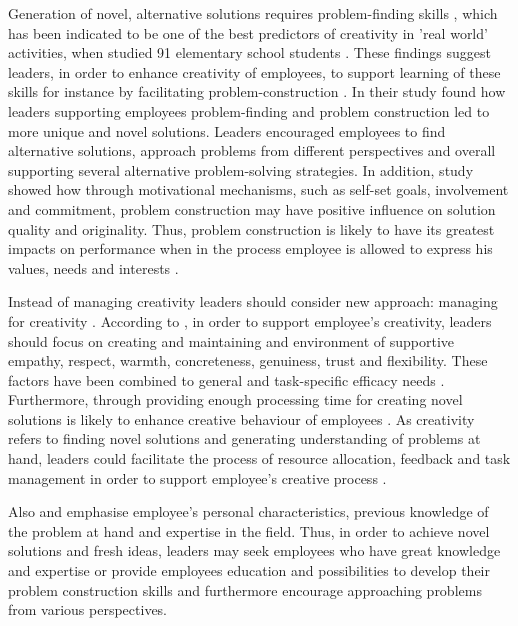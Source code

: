 Generation of novel, alternative solutions requires problem-finding skills \citep{runco1988problem}, which has been indicated to be one of the best predictors of creativity in 'real world' activities, when studied 91 elementary school students \citep{runco1990evaluating}. These findings suggest leaders, in order to enhance creativity of employees, to support learning of these skills for instance by facilitating problem-construction \citep{redmond1993putting}. In their study \citet{redmond1993putting} found how leaders supporting employees problem-finding and problem construction led to more unique and novel solutions. Leaders encouraged employees to find alternative solutions, approach problems from different perspectives and overall supporting several alternative problem-solving strategies. In addition, study showed how through motivational mechanisms, such as self-set goals, involvement and commitment, problem construction may have positive influence on solution quality and originality. Thus, problem construction is likely to have its greatest impacts on performance when in the process employee is allowed to express his values, needs and interests \citep{redmond1993putting}.

Instead of managing creativity leaders should consider new approach: managing for creativity \citep{amabile2008creativity}. According to \citet{isaksen1983toward}, in order to support employee's creativity, leaders should focus on creating and maintaining and environment of supportive empathy, respect, warmth, concreteness, genuiness, trust and flexibility. These factors have been combined to general and task-specific efficacy needs \citep{mumford1988creativity}. Furthermore, through providing enough processing time for creating novel solutions is likely to enhance creative behaviour of employees \citep{isaksen1983toward}. As creativity refers to finding novel solutions and generating understanding of problems at hand, leaders could facilitate the process of resource allocation, feedback and task management in order to support employee's creative process \citep{mumford1988creativity}. 

Also \citet{mumford1988creativity} and \citet{redmond1993putting} emphasise employee's personal characteristics, previous knowledge of the problem at hand and expertise in the field. Thus, in order to achieve novel solutions and fresh ideas, leaders may seek employees who have great knowledge and expertise or provide employees education and possibilities to develop their problem construction skills and furthermore encourage approaching problems from various perspectives. \citep{redmond1993putting} 

